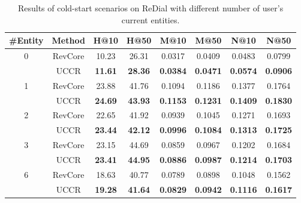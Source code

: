 \documentclass[sigconf,natbib=true]{acmart}
\begin{document}
\begin{table}[!th]
	\small
	\centering
\vspace{-0mm}
	\setlength{\tabcolsep}{3pt}
	\caption{Results of cold-start scenarios on ReDial with different number of user's current entities.}
\vspace{-2mm}
	\label{num_cur_entities}
	\begin{tabular}{@{}c|ccccccc@{}}
		\toprule
		\textbf{\#Entity} & \textbf{Method} & H@10 & H@50 & M@10 & M@50 & N@10 & N@50 \\
		\midrule
		
\multirow{2}{*}{0} & RevCore & 10.23 & 26.31 & 0.0317 & 0.0409 & 0.0483 & 0.0799 \\
		& UCCR & \textbf{11.61} & \textbf{28.36} & \textbf{0.0384} & \textbf{0.0471} & \textbf{0.0574} & \textbf{0.0906} \\
		\midrule
		\multirow{2}{*}{1} & RevCore & 23.88 & 41.76 & 0.1094 & 0.1186 & 0.1377 & 0.1764 \\
		& UCCR & \textbf{24.69} & \textbf{43.93} & \textbf{0.1153} & \textbf{0.1231} & \textbf{0.1409} & \textbf{0.1830} \\
		\midrule
		\multirow{2}{*}{2} & RevCore & 22.65 & 41.92 & 0.0939 & 0.1045 & 0.1271 & 0.1693 \\
		& UCCR & \textbf{23.44} & \textbf{42.12} & \textbf{0.0996} & \textbf{0.1084} & \textbf{0.1313} & \textbf{0.1725} \\
		\midrule
		\multirow{2}{*}{3} & RevCore & 23.15 & 44.69 & 0.0859 & 0.0967 & 0.1202 & 0.1684 \\
		& UCCR & \textbf{23.41} & \textbf{44.95} & \textbf{0.0886} & \textbf{0.0987} & \textbf{0.1214} & \textbf{0.1703} \\
		\midrule
		\multirow{2}{*}{ 6} & RevCore & 18.63 & 40.77 & 0.0789 & 0.0898 & 0.1048 & 0.1562 \\
		& UCCR & \textbf{19.28} & \textbf{41.64} & \textbf{0.0829} & \textbf{0.0942} & \textbf{0.1116} & \textbf{0.1617} \\
		\bottomrule
	\end{tabular}
	\vspace{-1.6mm}
\end{table}
\end{document}
